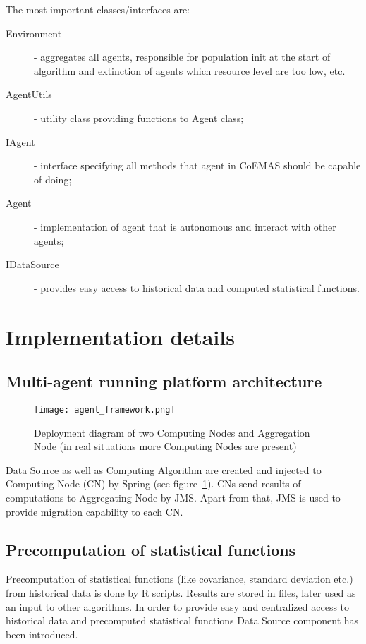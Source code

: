 The most important classes/interfaces are:

\begin{description}
  \item [Environment]
      - aggregates all agents, responsible for population init at the start of algorithm and extinction of agents which resource level are too low, etc.
  \item [AgentUtils]
      - utility class providing functions to Agent class;
  \item [IAgent]
      - interface specifying all methods that agent in CoEMAS should be capable of doing;
  \item [Agent]
      - implementation of agent that is autonomous and interact with other agents;
  \item [IDataSource]
      - provides easy access to historical data and computed statistical functions.
 
\end{description}



\section{Implementation details}
\label{sec:implDetails}


\subsection{Multi-agent running platform architecture}
\label{multi-agent}

\begin{figure}[ht]
  \begin{center}
    \texttt{[image: agent\_framework.png]}
  \end{center}
  \caption{Deployment diagram of two Computing Nodes and Aggregation Node (in real situations more Computing Nodes are present)}
  \label{platform_arch}
\end{figure}

Data Source as well as Computing Algorithm are created and injected to Computing Node (CN) by Spring (see figure~\ref{platform_arch}). 
CNs send results of computations to Aggregating Node by JMS. 
Apart from that, JMS is used to provide migration capability to each CN.


\subsection{Precomputation of statistical functions}
\label{precompute}
Precomputation of statistical functions (like covariance, standard deviation etc.) from historical data is done by R scripts. 
Results are stored in files, later used as an input to other algorithms.
In order to provide easy and centralized access to historical data and precomputed statistical functions Data Source component has been introduced. 

